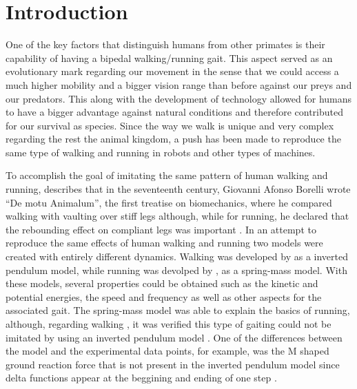

\section{Introduction}
One of the key factors that distinguish humans from other primates is their capability of having a bipedal walking/running gait. This aspect served as an evolutionary mark regarding our movement in the sense that we could access a much higher mobility and a bigger vision range than before against our preys and our predators. This along with the development of technology allowed for humans to have a bigger advantage against natural conditions and therefore contributed for our survival as species. Since the way we walk is unique and very complex \cite{Mochon&McMahon} regarding the rest the animal kingdom, a push has been made to reproduce the same type of walking and running in robots and other types of machines.


To accomplish the goal of imitating the same pattern of human walking and running, \cite{Seyfarth2006} describes that in the seventeenth century, Giovanni Afonso Borelli wrote ``De motu Animalum'', the first treatise on biomechanics, where he compared walking with vaulting over stiff legs although, while for running, he declared that the rebounding effect on compliant legs was important \cite{Borelli1685}. In an attempt to reproduce the same effects of human walking and running two models were created with entirely different dynamics. Walking was developed by \cite{Alexander1976,Mochon&McMahon,Cavagna1976} as a inverted pendulum model, while running was devolped by \cite{Blickhan1989,McMahon&Cheng1990}, as a spring-mass model. With these models, several properties could be obtained such as the kinetic and potential energies, the speed and frequency as well as other aspects for the associated gait. The spring-mass model was able to explain the basics of running, although, regarding walking , it was verified this type of gaiting could not be imitated by using an inverted pendulum model \cite{Full&Koditchek1999}. One of the differences between the model and the experimental data points, for example, was the M shaped ground reaction force that is not present in the inverted pendulum model since  delta functions appear at the beggining and ending of one step \cite{Pandy2003}.

